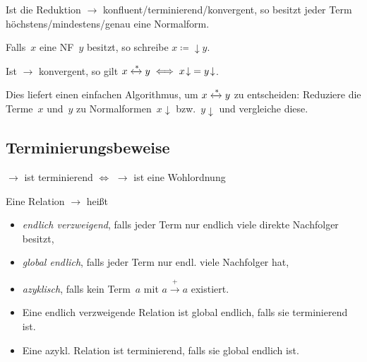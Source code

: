 \documentclass{cheat-sheet}
\newcommand{\strictlyReducesTo}{\xrightarrow{+}}
\newcommand{\zzEq}{\xleftrightarrow{*}} %
\newcommand{\NF}[1]{{{#1}\!\downarrow}} %
\begin{document}
\begin{lem}
  Ist die Reduktion ${\to}$ konfluent/terminierend/konvergent, so besitzt jeder Term höchstens/mindestens/genau eine Normalform.
\end{lem}

\begin{nota}
  Falls~$x$ eine NF~$y$ besitzt, so schreibe $x \NF \coloneqq y$.
\end{nota}

\begin{thm}
  Ist ${\to}$ konvergent, so gilt $x \zzEq y \iff \NF{x} = \NF{y}$.
\end{thm}

\begin{bem}
  Dies liefert einen einfachen Algorithmus, um $x \zzEq y$ zu entscheiden: Reduziere die Terme~$x$ und~$y$ zu Normalformen~$\NF{x}$ bzw.~$\NF{y}$ und vergleiche diese.
\end{bem}

\subsection{Terminierungsbeweise}

\begin{lem}
  ${\to}$ ist terminierend $\iff$ ${\to}$ ist eine Wohlordnung
\end{lem}

\begin{defn}
  Eine Relation ${\to}$ heißt
  \begin{itemize}
    \item \emph{endlich verzweigend}, falls jeder Term nur endlich viele direkte Nachfolger besitzt,
    \item \emph{global endlich}, falls jeder Term nur endl. viele Nachfolger hat,
    \item \emph{azyklisch}, falls kein Term~$a$ mit $a \strictlyReducesTo a$ existiert.
  \end{itemize}
\end{defn}

\begin{lem}
  \begin{itemize}
    \item Eine endlich verzweigende Relation ist global endlich, falls sie terminierend ist.
    \item Eine azykl. Relation ist terminierend, falls sie global endlich ist.
  \end{itemize}
\end{lem}
\end{document}
